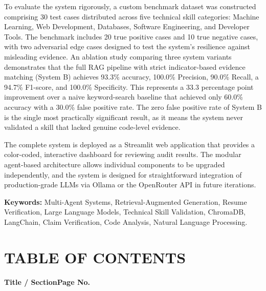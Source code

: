 \documentclass[12pt,a4paper]{report}
\begin{document}
To evaluate the system rigorously, a custom benchmark dataset was constructed comprising 30 test cases distributed across five technical skill categories: Machine Learning, Web Development, Databases, Software Engineering, and Developer Tools. The benchmark includes 20 true positive cases and 10 true negative cases, with two adversarial edge cases designed to test the system's resilience against misleading evidence. An ablation study comparing three system variants demonstrates that the full RAG pipeline with strict indicator-based evidence matching (System B) achieves 93.3\% accuracy, 100.0\% Precision, 90.0\% Recall, a 94.7\% F1-score, and 100.0\% Specificity. This represents a 33.3 percentage point improvement over a naive keyword-search baseline that achieved only 60.0\% accuracy with a 30.0\% false positive rate. The zero false positive rate of System B is the single most practically significant result, as it means the system never validated a skill that lacked genuine code-level evidence.

The complete system is deployed as a Streamlit web application that provides a color-coded, interactive dashboard for reviewing audit results. The modular agent-based architecture allows individual components to be upgraded independently, and the system is designed for straightforward integration of production-grade LLMs via Ollama or the OpenRouter API in future iterations.

\vspace{0.8cm}
\noindent \textbf{Keywords:} Multi-Agent Systems, Retrieval-Augmented Generation, Resume Verification, Large Language Models, Technical Skill Validation, ChromaDB, LangChain, Claim Verification, Code Analysis, Natural Language Processing.


\cleardoublepage
\chapter*{\hfill\Large\bfseries TABLE OF CONTENTS\hfill}
\vspace{0.1in}
\noindent\textbf{Title / Section}\hfill\textbf{Page No.}\par
\vspace{0.12in}
\begingroup
\makeatletter
\let\chapter\relax
\let\clearpage\relax
{}
\makeatother
\endgroup
\end{document}
